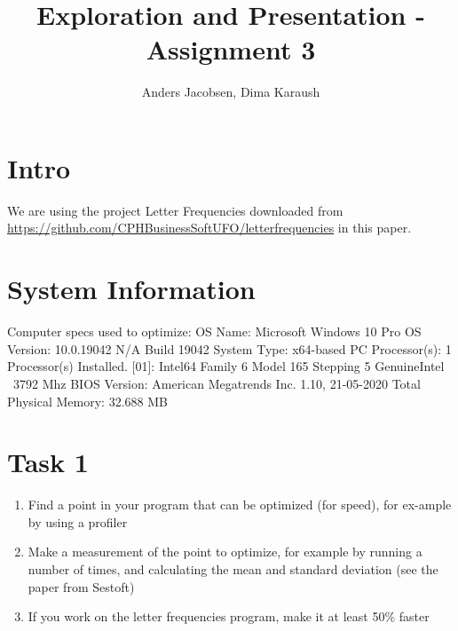 \documentclass{article}
\author{Anders Jacobsen, Dima Karaush}
\title{Exploration and Presentation - Assignment 3}
\begin{document}
\maketitle

\newpage
\tableofcontents

\newpage
\section*{Intro}
We are using the project Letter Frequencies downloaded 
from \url{https://github.com/CPHBusinessSoftUFO/letterfrequencies} 
in this paper.

\section*{System Information}
Computer specs used to optimize: 
OS Name:                   Microsoft Windows 10 Pro
OS Version:                10.0.19042 N/A Build 19042
System Type:               x64-based PC
Processor(s):              1 Processor(s) Installed.
                           [01]: Intel64 Family 6 Model 165 Stepping 5 GenuineIntel ~3792 Mhz
BIOS Version:              American Megatrends Inc. 1.10, 21-05-2020
Total Physical Memory:     32.688 MB

\section{Task 1}
\begin{enumerate}
    \item Find a point in your program that can be optimized (for speed), 
    for ex-ample by using a profiler
    \item Make a measurement of the point to optimize, for example by 
    running a number of times, and calculating the mean and standard 
    deviation (see the paper from Sestoft)
    \item If you work on the letter frequencies program, make it at least 50\% faster
\end{enumerate}
\end{document}
